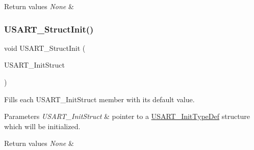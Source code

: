 \begin{DoxyRetVals}{Return values}
{\em None} & \\
\hline
\end{DoxyRetVals}
\mbox{\label{group___u_s_a_r_t___group1_ga34e1faa2f312496c16cfd05155f4c8b1}} 
\subsubsection{\texorpdfstring{U\+S\+A\+R\+T\+\_\+\+Struct\+Init()}{USART\_StructInit()}}
{\footnotesize\ttfamily void U\+S\+A\+R\+T\+\_\+\+Struct\+Init (\begin{DoxyParamCaption}\item[{\mbox{\hyperlink{struct_u_s_a_r_t___init_type_def}{U\+S\+A\+R\+T\+\_\+\+Init\+Type\+Def}} $\ast$}]{U\+S\+A\+R\+T\+\_\+\+Init\+Struct }\end{DoxyParamCaption})}



Fills each U\+S\+A\+R\+T\+\_\+\+Init\+Struct member with its default value. 


\begin{DoxyParams}{Parameters}
{\em U\+S\+A\+R\+T\+\_\+\+Init\+Struct} & pointer to a \mbox{\hyperlink{struct_u_s_a_r_t___init_type_def}{U\+S\+A\+R\+T\+\_\+\+Init\+Type\+Def}} structure which will be initialized. \\
\hline
\end{DoxyParams}

\begin{DoxyRetVals}{Return values}
{\em None} & \\
\hline
\end{DoxyRetVals}
